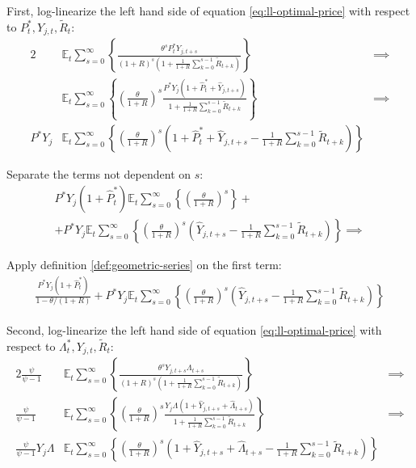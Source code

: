 \documentclass[
	12pt,
	]{article}
\numberwithin{equation}{section}
\newcommand{\E}[1][t]{{\mathbb{E}_{#1}}}
\theoremstyle{definition}
\theoremstyle{plain}
\theoremstyle{plain}
\theoremstyle{plain}
\begin{document}
First, log-linearize the left hand side of equation \ref{eq:ll-optimal-price} with respect to \( P_t^\ast, Y_{j,t}, \widetilde{R}_t \):
\begin{alignat}{2}
	& \E \sum_{s=0}^{\infty} \left\{ \frac{\theta^s P_t^\ast Y_{j,t+s}}{ (1 + R)^s \left( 1 + \frac{1}{1 + R} \sum_{k=0}^{s-1} \widetilde{R}_{t+k} \right) } \right\} &\implies \nonumber \\
	& \E \sum_{s=0}^{\infty} \left\{ \left( \frac{\theta}{1 + R} \right)^s  \frac{ P^\ast Y_{j} \left( 1 + \hat{P}_t^\ast + \hat{Y}_{j,t+s} \right) }{ 1 + \frac{1}{1 + R} \sum_{k=0}^{s-1} \widetilde{R}_{t+k} } \right\} &\implies \nonumber \\
	P^\ast Y_{j} &\E \sum_{s=0}^{\infty} \left\{ \left( \frac{\theta}{1 + R} \right)^s \left( 1 + \hat{P}_t^\ast + \hat{Y}_{j,t+s} - \frac{1}{1 + R} \sum_{k=0}^{s-1} \widetilde{R}_{t+k} \right) \right\} & \nonumber
\end{alignat}

Separate the terms not dependent on $s$:
\begin{multline}
	P^\ast Y_{j} ( 1 + \hat{P}_t^\ast ) \E \sum_{s=0}^{\infty} \left\{ \left( \frac{\theta}{1 + R} \right)^s \right\} + \\
	+ P^\ast Y_{j} \E \sum_{s=0}^{\infty} \left\{ \left( \frac{\theta}{1 + R} \right)^s \left( \hat{Y}_{j,t+s} - \frac{1}{1 + R} \sum_{k=0}^{s-1} \widetilde{R}_{t+k} \right) \right\} \implies \nonumber
\end{multline}

Apply definition \ref{def:geometric-series} on the first term:
\begin{align}
	\frac{ P^\ast Y_{j} ( 1 + \hat{P}_t^\ast ) }{1-\theta /(1+R)} + P^\ast Y_{j} \E \sum_{s=0}^{\infty} \left\{ \left( \frac{\theta}{1 + R} \right)^s \left( \hat{Y}_{j,t+s} - \frac{1}{1 + R} \sum_{k=0}^{s-1} \widetilde{R}_{t+k} \right) \right\} \nonumber
\end{align}

Second, log-linearize the left hand side of equation \ref{eq:ll-optimal-price} with respect to \( \Lambda_t^\ast, Y_{j,t}, \widetilde{R}_t \):
\begin{alignat}{2}
	\frac{\psi}{\psi-1} &\E \sum_{s=0}^{\infty} \left\{ \frac{\theta^s Y_{j,t+s} \Lambda_{t+s}}{ (1 + R)^s \left( 1 + \frac{1}{1 + R} \sum_{k=0}^{s-1} \widetilde{R}_{t+k} \right) } \right\} & \implies \nonumber \\
	\frac{\psi}{\psi-1} &\E \sum_{s=0}^{\infty} \left\{ \left( \frac{\theta}{1 + R} \right)^s \frac{ Y_{j} \Lambda (1+ \hat{Y}_{j,t+s} + \hat{\Lambda}_{t+s}) }{ 1 + \frac{1}{1 + R} \sum_{k=0}^{s-1} \widetilde{R}_{t+k} } \right\} & \implies \nonumber \\
	\frac{\psi}{\psi-1} Y_{j} \Lambda &\E \sum_{s=0}^{\infty} \left\{ \left( \frac{\theta}{1 + R} \right)^s \left( 1+ \hat{Y}_{j,t+s} + \hat{\Lambda}_{t+s} - \frac{1}{1 + R} \sum_{k=0}^{s-1} \widetilde{R}_{t+k} \right) \right\} & \nonumber
\end{alignat}
\end{document}
